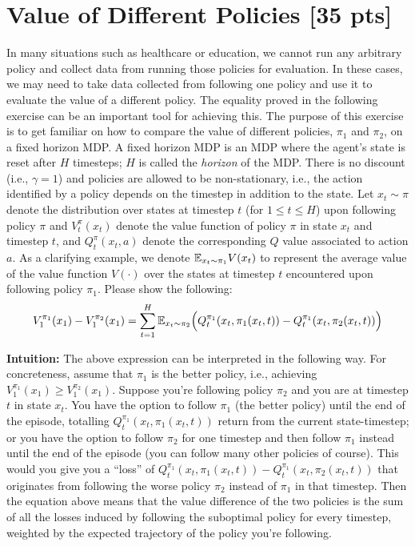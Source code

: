 \section{Value of Different Policies [35 pts]}
In many situations such as healthcare or education, we cannot run any arbitrary policy and collect data from running those policies for evaluation. In these cases, we may need to take data collected from following one policy and use it to evaluate the value of a different policy. The equality proved in the following exercise can be an important tool for achieving this.
The purpose of this exercise is to get familiar on how to compare the value of different policies, $\pi_1$ and $\pi_2$, on a fixed horizon MDP. A fixed horizon MDP is an MDP where the agent's state is reset after $H$ timesteps; $H$ is called the \emph{horizon} of the MDP. There is no discount (i.e., $\gamma=1$) and policies are allowed to be non-stationary, i.e., the action identified by a policy depends on the timestep in addition to the state.
Let $x_t\sim \pi$ denote the distribution over states at timestep $t$ (for $1\leq t \leq H$) upon following policy $\pi$ and $V^{\pi}_t(x_t)$ denote the value function of policy $\pi$ in state
$x_t$ and timestep $t$, and $Q_t^{\pi}(x_t,a)$ denote the corresponding
$Q$ value associated to action $a$. As a clarifying example, we denote $\mathbb E_{x_t \sim \pi_1} V(x_t)$ to represent the average value of the value function $V(\cdot)$ over the states at timestep $t$ encountered upon following policy $\pi_1$. Please show the following:
\begin{equation}
\label{eq:1}
V_1^{\pi_1}(x_1) - V_1^{\pi_2}(x_1) =  \sum_{t=1}^H \mathbb E_{x_t \sim \pi_2} \Big( Q_t^{\pi_1}(x_t,\pi_1(x_t,t)) - Q_t^{\pi_1}(x_t,\pi_2(x_t,t)) \Big)
\end{equation}

\textbf{Intuition:} The above expression can be interpreted in the following way. For concreteness, assume that $\pi_1$ is the better policy, i.e., achieving $V_1^{\pi_1}(x_1) \geq V_1^{\pi_2}(x_1)$. Suppose you're following policy $\pi_2$ and you are at timestep $t$ in state $x_t$.
You have the option to follow $\pi_1$ (the better policy) until the end of the episode, totalling $Q_t^{\pi_1}(x_t,\pi_1(x_t,t))$ return from the current state-timestep; or you have the option to follow $\pi_2$ for one timestep and then follow $\pi_1$ instead until the end of the episode (you can follow many other policies of course). This would you give you a ``loss'' of $Q_t^{\pi_1}(x_t,\pi_1(x_t,t)) - Q_t^{\pi_1}(x_t,\pi_2(x_t,t))$ that originates from following the worse policy $\pi_2$ instead of $\pi_1$ in that timestep.
Then the equation above
means that the value difference of the two policies is the sum of all the losses induced by following the suboptimal policy for every timestep, weighted by the expected trajectory of the policy you're following.

